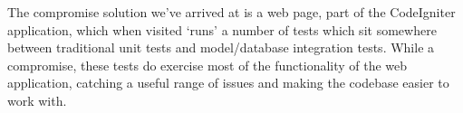 The compromise solution we've arrived at is a web page, part of the
CodeIgniter application, which when visited `runs' a number of tests
which sit somewhere between traditional unit tests and model/database
integration tests.  While a compromise, these tests do exercise most
of the functionality of the web application, catching a useful range
of issues and making the codebase easier to work with.
